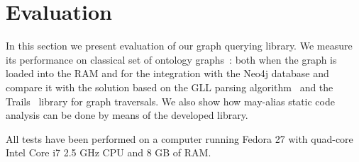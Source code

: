 \section{Evaluation}

In this section we present evaluation of our graph querying library.
We measure its performance on classical set of ontology graphs~\cite{CFGonRDF}: both when the graph is loaded into the RAM and for the integration with the Neo4j database and compare it with the solution based on the GLL parsing algorithm~\cite{GrigorevR16} and the Trails~\cite{ScalaGraphParsing} library for graph traversals. We also show how may-alias static code analysis can be done by means of the developed library. 

All tests have been performed on a computer running Fedora 27 with quad-core Intel Core i7 2.5 GHz CPU and 8 GB of RAM.


